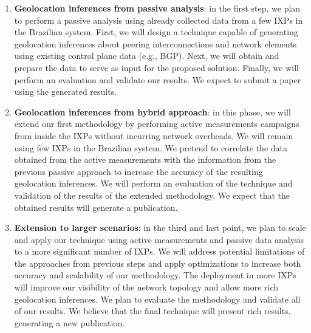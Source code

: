 \begin{enumerate}
\item {\bf Geolocation inferences from passive analysis}: in the first step, we plan to perform a passive analysis using already collected data from a few IXPs in the Brazilian system. First, we will design a technique capable of generating geolocation inferences about peering interconnections and network elements using existing control plane data (e.g., BGP). Next, we will obtain and prepare the data to serve as input for the proposed solution. Finally, we will perform an evaluation and validate our results. We expect to submit a paper using the generated results.

\item {\bf Geolocation inferences from hybrid approach}: in this phase, we will extend our first methodology by performing active measurements campaigns from inside the IXPs without incurring network overheads. We will remain using few IXPs in the Brazilian system. We pretend to correlate the data obtained from the active measurements with the information from the previous passive approach to increase the accuracy of the resulting geolocation inferences. We will perform an evaluation of the technique and validation of the results of the extended methodology. We expect that the obtained results will generate a publication.

\item {\bf Extension to larger scenarios}: in the third and last point, we plan to scale and apply our technique using active measurements and passive data analysis to a more significant number of IXPs. We will address potential limitations of the approaches from previous steps and apply optimizations to increase both accuracy and scalability of our methodology. The deployment in more IXPs will improve our visibility of the network topology and allow more rich geolocation inferences. We plan to evaluate the methodology and validate all of our results. We believe that the final technique will present rich results, generating a new publication.



\end{enumerate}
